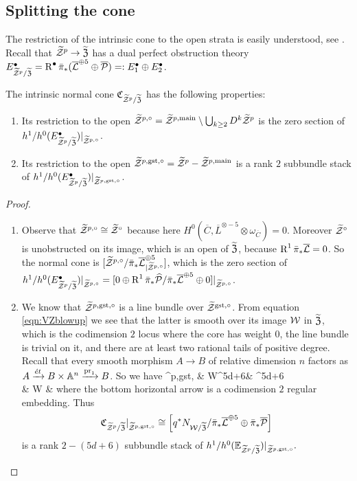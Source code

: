 \subsection{Splitting the cone} The restriction of the intrinsic cone to the open strata is easily understood, see \cite[Lemma 4.3]{CL-pfields}. Recall that $\widetilde{\mathcal Z}^p\rightarrow\widetilde{\mathfrak Z}$ has a dual perfect obstruction theory $E^{\bullet}_{\widetilde{\mathcal Z}^p/\widetilde{\mathfrak Z}}=\operatorname{R}^{\bullet}\bar\pi_*(\overline{\mathcal{L}}^{\oplus 5}\oplus\overline{\mathcal P})=:E^{\bullet}_1\oplus E^{\bullet}_2$.
\begin{lem}\label{lem:open_cones}
The intrinsic normal cone $\mathfrak{C}_{\widetilde{\mathcal Z}^p/\widetilde{\mathfrak Z}}$ has the following properties:
\begin{enumerate}
\item Its restriction to the open $\widetilde{\mathcal Z}^{p,\circ}= \widetilde{\mathcal Z}^{p,\rm{main}}\setminus \bigcup_{k\geq 2}D^k \widetilde{\mathcal Z}^p$ is the zero section of $h^1/h^0(E^{\bullet}_{\widetilde{\mathcal Z}^p/\widetilde{\mathfrak Z}})\rvert_{\widetilde{\mathcal Z}^{p,\circ}}$.
\item Its restriction to the open $\widetilde{\mathcal Z}^{p,\rm{gst},\circ}=\widetilde{\mathcal Z}^p - \widetilde{\mathcal Z}^{p,\rm{main}}$  is a rank $2$ subbundle stack of $h^1/h^0(E^{\bullet}_{\widetilde{\mathcal Z}^p/\widetilde{\mathfrak Z}})\rvert_{\widetilde{\mathcal Z}^{p,\rm{gst},\circ}}$.
\end{enumerate}
\end{lem}
\begin{proof}\begin{enumerate}[leftmargin=.8cm]
\item Observe that $\widetilde{\mathcal Z}^{p,\circ}\cong \widetilde{\mathcal Z}^{\circ}$ because here $H^0(\overline{C}, \overline{L}^{\otimes -5}\otimes \omega_{\overline{C}})=0$. Moreover $\widetilde{\mathcal Z}^{\circ}$ is unobstructed on its image, which is an open of $\widetilde{\mathfrak Z}$, because $\operatorname{R}^1\bar{\pi}_*\overline{\mathcal{L}}=0$.
So the normal cone is $[\widetilde{\mathcal Z}^{p,\circ}/\bar{\pi}_*\overline{\mathcal{L}}^{\oplus 5}_{\rvert\widetilde{\mathcal Z}^{p,\circ}}]$, which is the zero section of $h^1/h^0(E^{\bullet}_{\widetilde{\mathcal Z}^p/\widetilde{\mathfrak Z}})\rvert_{\widetilde{\mathcal Z}^{p,\circ}}=[0\oplus \operatorname{R}^1\bar{\pi}_*\widehat{\mathcal P}/\bar{\pi}_*\overline{\mathcal{L}}^{\oplus 5}\oplus 0]\rvert_{\widetilde{\mathcal Z}^{p,\circ}}$.

\item We know that $\widetilde{\mathcal Z}^{p,\rm{gst},\circ}$ is a line bundle over $\widetilde{\mathcal Z}^{\rm{gst},\circ}$. From equation \ref{eqn:VZblowup} we see that the latter is smooth over its image $\mathcal W$ in $\widetilde{\mathfrak Z}$, which is the codimension $2$ locus where the core has weight $0$, the line bundle is trivial on it, and there are at least two rational tails of positive degree. Recall that every smooth morphism $A\to B$ of relative dimension $n$ factors as $A\xrightarrow{\acute{e}t} B\times \mathbb{A}^n\xrightarrow{\operatorname{pr}_1} B$. So we have
\bcd
\tZ^{p,\rm{gst},\circ} \ar[r,"\acute{e}t"] & \pazocal W\times\Aaff^{5d+6}\ar[r,hook]\ar[d,"q"] & \tXP\times \Aaff^{5d+6}\ar[d] \\
& \pazocal W \ar[r,hook] & \tXP
\ecd
where the bottom horizontal arrow is a codimension $2$ regular embedding. Thus 
\[\mathfrak{C}_{\widetilde{\mathcal Z}^p/\widetilde{\mathfrak Z}}\rvert_{\widetilde{\mathcal Z}^{p,\rm{gst},\circ}}\cong \left[ q^* N_{\mathcal W/\widetilde{\mathfrak Z}}/ \bar{\pi}_*\overline{\mathcal{L}}^{\oplus 5}\oplus\bar{\pi}_*\overline{\mathcal P}\right]\]
is a rank $2-(5d+6)$ subbundle stack of  $h^1/h^0(\mathbb E_{\widetilde{\mathcal Z}^p/\widetilde{\mathfrak Z}})\rvert_{\widetilde{\mathcal Z}^{p,\rm{gst},\circ}}.$
\end{enumerate}
\end{proof}
